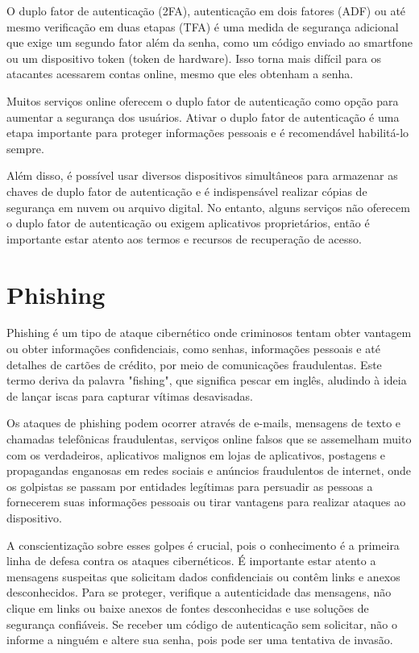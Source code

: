 \documentclass[12pt]{article}
\begin{document}
O duplo fator de autenticação (2FA), autenticação em dois fatores (ADF) ou
até mesmo verificação em duas etapas (TFA) é uma medida de segurança
adicional que exige um segundo fator além da senha, como um código enviado
ao smartfone ou um dispositivo token (token de hardware).
Isso torna mais difícil para os atacantes acessarem contas online, mesmo
que eles obtenham a senha.

Muitos serviços online oferecem o duplo fator de autenticação como opção
para aumentar a segurança dos usuários.
Ativar o duplo fator de autenticação é uma etapa importante para proteger
informações pessoais e é recomendável habilitá-lo sempre.

Além disso, é possível usar diversos dispositivos simultâneos
para armazenar as chaves de duplo fator de autenticação e é indispensável
realizar cópias de segurança em nuvem ou arquivo digital.
No entanto, alguns serviços não oferecem o duplo fator de autenticação ou
exigem aplicativos proprietários, então é importante estar atento aos
termos e recursos de recuperação de acesso.

\section{Phishing}

Phishing é um tipo de ataque cibernético onde criminosos tentam obter
vantagem ou obter informações confidenciais, como senhas, informações
pessoais e até detalhes de cartões de crédito, por meio de comunicações
fraudulentas.
Este termo deriva da palavra "fishing", que significa pescar em inglês,
aludindo à ideia de lançar iscas para capturar vítimas desavisadas.

Os ataques de phishing podem ocorrer através de e-mails, mensagens de
texto e chamadas telefônicas fraudulentas, serviços online falsos que
se assemelham muito com os verdadeiros, aplicativos malignos em lojas
de aplicativos, postagens e propagandas enganosas em redes sociais e
anúncios fraudulentos de internet, onde os golpistas se passam por
entidades legítimas para persuadir as pessoas a fornecerem suas informações
pessoais ou tirar vantagens para realizar ataques ao dispositivo.

A conscientização sobre esses golpes é crucial, pois o conhecimento é a
primeira linha de defesa contra os ataques cibernéticos.
É importante estar atento a mensagens suspeitas que solicitam dados
confidenciais ou contêm links e anexos desconhecidos. Para se proteger,
verifique a autenticidade das mensagens, não clique em links ou baixe
anexos de fontes desconhecidas e use soluções de segurança confiáveis.
Se receber um código de autenticação sem solicitar, não o informe a
ninguém e altere sua senha, pois pode ser uma tentativa de invasão.
\end{document}
